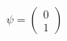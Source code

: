 \documentclass[preview]{standalone}
\begin{document}
\begin{align*}
\psi = \begin{pmatrix} 0 \\ 1 \end{pmatrix}
\end{align*}
\end{document}
